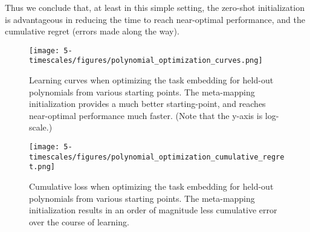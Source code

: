 Thus we conclude that, at least in this simple setting, the zero-shot initialization is advantageous in reducing the time to reach near-optimal performance, and the cumulative regret (errors made along the way). \par 
\begin{figure}
\centering
\texttt{[image: 5-timescales/figures/polynomial\_optimization\_curves.png]}
\caption{Learning curves when optimizing the task embedding for held-out polynomials from various starting points. The meta-mapping initialization provides a much better starting-point, and reaches near-optimal performance much faster. (Note that the y-axis is log-scale.)} \label{fig:timescales_polynomial_optimization_curves}
\end{figure}

\begin{figure}
\centering
\texttt{[image: 5-timescales/figures/polynomial\_optimization\_cumulative\_regret.png]}
\caption{Cumulative loss when optimizing the task embedding for held-out polynomials from various starting points. The meta-mapping initialization results in an order of magnitude less cumulative error over the course of learning.} \label{fig:timescales_polynomial_optimization_regret}
\end{figure}

